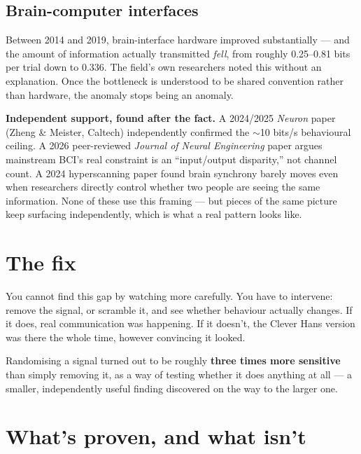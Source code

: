 \documentclass[11pt]{article}
\begin{document}
\subsection*{Brain-computer interfaces}
Between 2014 and 2019, brain-interface hardware improved substantially --- and the amount of information actually transmitted \emph{fell}, from roughly 0.25--0.81 bits per trial down to 0.336. The field's own researchers noted this without an explanation. Once the bottleneck is understood to be shared convention rather than hardware, the anomaly stops being an anomaly.

\begin{opennbox}
\textbf{Independent support, found after the fact.} A 2024/2025 \textit{Neuron} paper (Zheng \& Meister, Caltech) independently confirmed the $\sim$10 bits/s behavioural ceiling. A 2026 peer-reviewed \textit{Journal of Neural Engineering} paper argues mainstream BCI's real constraint is an ``input/output disparity,'' not channel count. A 2024 hyperscanning paper found brain synchrony barely moves even when researchers directly control whether two people are seeing the same information. None of these use this framing --- but pieces of the same picture keep surfacing independently, which is what a real pattern looks like.
\end{opennbox}

\section{The fix}

You cannot find this gap by watching more carefully. You have to intervene: remove the signal, or scramble it, and see whether behaviour actually changes. If it does, real communication was happening. If it doesn't, the Clever Hans version was there the whole time, however convincing it looked.

\begin{pullquote}
Randomising a signal turned out to be roughly \textbf{three times more sensitive} than simply removing it, as a way of testing whether it does anything at all --- a smaller, independently useful finding discovered on the way to the larger one.
\end{pullquote}

\section{What's proven, and what isn't}
\end{document}
